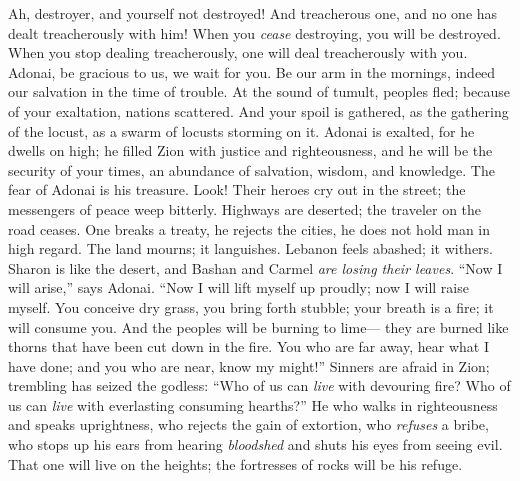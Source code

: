 \begin{biblechapter} %
 Ah, destroyer, and yourself not destroyed! 
And treacherous one, and no one has dealt treacherously with him! 
When you \textit{cease} destroying, you will be destroyed. 
When you stop dealing treacherously, one will deal treacherously with you.
\verse Adonai, be gracious to us, we wait for you. 
Be our arm in the mornings, 
indeed our salvation in the time of trouble.
\verse At the sound of tumult, peoples fled; 
because of your exaltation, nations scattered.
\verse And your spoil is gathered, 
as the gathering of the locust, 
as a swarm of locusts storming on it.
\verse Adonai is exalted, for he dwells on high; 
he filled Zion with justice and righteousness,
\verse and he will be the security of your times, 
an abundance of salvation, wisdom, and knowledge. The fear of Adonai is his treasure.
\verse Look! Their heroes cry out in the street; 
the messengers of peace weep bitterly.
\verse Highways are deserted; 
the traveler on the road ceases. 
One breaks a treaty, 
he rejects the cities, 
he does not hold man in high regard.
\verse The land mourns; it languishes. 
Lebanon feels abashed; it withers. 
Sharon is like the desert, 
and Bashan and Carmel \textit{are losing their leaves}.
\verse “Now I will arise,” says Adonai. 
“Now I will lift myself up proudly; 
now I will raise myself.
\verse You conceive dry grass, you bring forth stubble; 
your breath is a fire; it will consume you.
\verse And the peoples will be burning to lime— 
they are burned like thorns that have been cut down in the fire.
\verse You who are far away, hear what I have done; 
and you who are near, know my might!”
\verse Sinners are afraid in Zion; 
trembling has seized the godless: 
“Who of us can \textit{live} with devouring fire? 
Who of us can \textit{live} with everlasting consuming hearths?”
\verse He who walks in righteousness 
and speaks uprightness, 
who rejects the gain of extortion, 
who \textit{refuses} a bribe, 
who stops up his ears from hearing \textit{bloodshed} 
and shuts his eyes from seeing evil.
\verse That one will live on the heights; 
the fortresses of rocks will be his refuge. 

\end{biblechapter}
